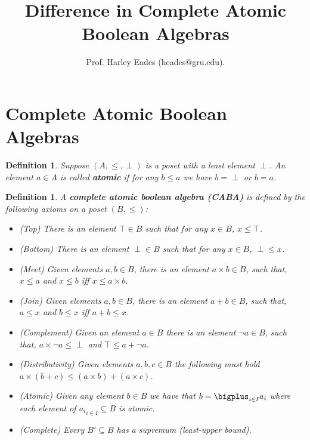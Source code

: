\documentclass{article}
\title{Difference in Complete Atomic Boolean Algebras}
\author{Prof. Harley Eades (heades@gru.edu).}
\date{\vspace{-22px}}
\newtheorem{definition}[thm]{Definition}
\begin{document}
\maketitle

\section{Complete Atomic Boolean Algebras}
\label{sec:complete_atomic_boolean_algebras}
\vspace{10px}
\begin{definition}
  \label{def:atomic}
  Suppose $(A, \leq, \perp)$ is a poset with a least element $\perp$.
  An element $a \in A$ is called \textbf{atomic} if for any $b \leq a$
  we have $b = \perp$ or $b = a$.
\end{definition}


\vspace{10px}
\begin{definition}
  \label{def:CABA}
  A \textbf{complete atomic boolean algebra (CABA)} is defined by the
  following axioms on a poset $(B, \leq)$:
  \begin{itemize}
  \item (Top) There is an element $\top \in B$ such that for any $x \in B$, $x \leq \top$.
  \item (Bottom) There is an element $\perp \in B$ such that for any $x \in B$, $\perp \leq x$.
  \item (Meet) Given elements $a,b \in B$, there is an element $a \times b \in B$, such that,
    $x \leq a$ and $x \leq b$ iff $x \leq a \times b$.
  \item (Join) Given elements $a,b \in B$, there is an element $a + b \in B$, such that,
    $a \leq x$ and $b \leq x$ iff $a + b \leq x$.
  \item (Complement) Given an element $a \in B$ there is an element $\lnot a \in B$, such that,
    $a \times \lnot a \leq \perp$ and $\top \leq a + \lnot a$.
  \item (Distributivity) Given elements $a, b, c \in B$ the following
    must hold $a \times (b + c) \leq (a \times b) + (a \times c)$.
    
  \item (Atomic) Given any element $b \in B$ we have that $b =
    \bigplus_{i \in I} a_i$ where each element of ${a_i}_{i \in I} \subseteq B$ is atomic.
    
  \item (Complete) Every $B' \subseteq B$ has a supremum (least-upper bound).
  \end{itemize}
\end{definition}
\end{document}
